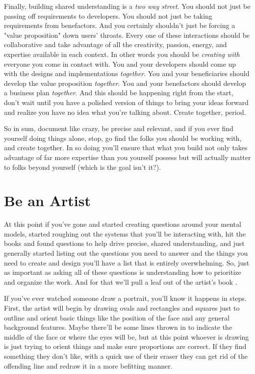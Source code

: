 \documentclass[11pt,a5paper]{book}
\begin{document}
Finally, building shared understanding is a \textit{two way street}. You should not just be passing off requirements to developers. You should not just be taking requirements from benefactors. And you certainly shouldn't just be forcing a "value proposition" down users' throats. Every one of these interactions should be collaborative and take advantage of all the creativity, passion, energy, and expertise available in each context. In other words you should be \textit{creating with} everyone you come in contact with. You and your developers should come up with the designs and implementations \textit{together}. You and your beneficiaries should develop the value proposition \textit{together}. You and your benefactors should develop a business plan \textit{together}. And this should be happening right from the start, don't wait until you have a polished version of things to bring your ideas forward and realize you have no idea what you're talking about. Create together, period.
\newline

So in sum, document like crazy, be precise and relevant, and if you ever find yourself doing things alone, stop, go find the folks you should be working with, and create together. In so doing you'll ensure that what you build not only takes advantage of far more expertise than you yourself possess but will actually matter to folks beyond yourself (which is the goal isn't it?).

\section{Be an Artist}
At this point if you've gone and started creating questions around your mental models, started roughing out the systems that you'll be interacting with, hit the books and found questions to help drive precise, shared understanding, and just generally started listing out the questions you need to answer and the things you need to create and design you'll have a list that is entirely overwhelming. So, just as important as asking all of these questions is understanding how to prioritize and organize the work. And for that we'll pull a leaf out of the artist's book \cite{patton}.
\newline

If you've ever watched someone draw a portrait, you'll know it happens in steps. First, the artist will begin by drawing ovals and rectangles and squares just to outline and orient basic things like the position of the face and any general background features. Maybe there'll be some lines thrown in to indicate the middle of the face or where the eyes will be, but at this point whoever is drawing is just trying to orient things and make sure proportions are correct. If they find something they don't like, with a quick use of their eraser they can get rid of the offending line and redraw it in a more befitting manner. 
\newline
\end{document}
